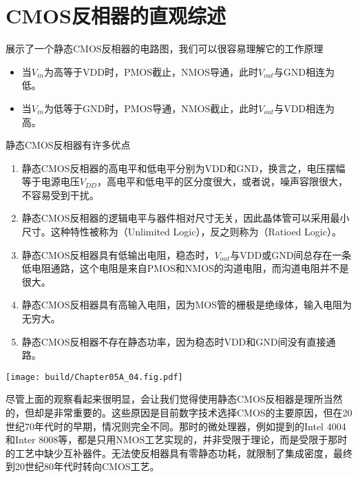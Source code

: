 \section{CMOS反相器的直观综述}

展示了一个静态CMOS反相器的电路图，我们可以很容易理解它的工作原理
\begin{itemize}
    \item 当$V_{in}$为高等于VDD时，PMOS截止，NMOS导通，此时$V_{out}$与GND相连为低。
    \item 当$V_{in}$为低等于GND时，PMOS导通，NMOS截止，此时$V_{out}$与VDD相连为高。
\end{itemize}


静态CMOS反相器有许多优点
\begin{enumerate}
    \item 静态CMOS反相器的高电平和低电平分别为VDD和GND，换言之，电压摆幅等于电源电压$V_{DD}$，高电平和低电平的区分度很大，或者说，噪声容限很大，不容易受到干扰。
    \item 静态CMOS反相器的逻辑电平与器件相对尺寸无关，因此晶体管可以采用最小尺寸。这种特性被称为（Unlimited Logic），反之则称为（Ratioed Logic）。
    \item 静态CMOS反相器具有低输出电阻，稳态时，$V_{out}$与VDD或GND间总存在一条低电阻通路，这个电阻是来自PMOS和NMOS的沟道电阻，而沟道电阻并不是很大。
    \item 静态CMOS反相器具有高输入电阻，因为MOS管的栅极是绝缘体，输入电阻为无穷大。
    \item 静态CMOS反相器不存在静态功率，因为稳态时VDD和GND间没有直接通路。
\end{enumerate}

\begin{Figure}[CMOS反相器]
    \texttt{[image: build/Chapter05A\_04.fig.pdf]}
\end{Figure}

尽管上面的观察看起来很明显，会让我们觉得使用静态CMOS反相器是理所当然的，但却是非常重要的。这些原因是目前数字技术选择CMOS的主要原因，但在20世纪70年代时的早期，情况则完全不同。那时的微处理器，例如提到的Intel 4004和Inter 8008等，都是只用NMOS工艺实现的，并非受限于理论，而是受限于那时的工艺中缺少互补器件。无法使反相器具有零静态功耗，就限制了集成密度，最终到20世纪80年代时转向CMOS工艺。